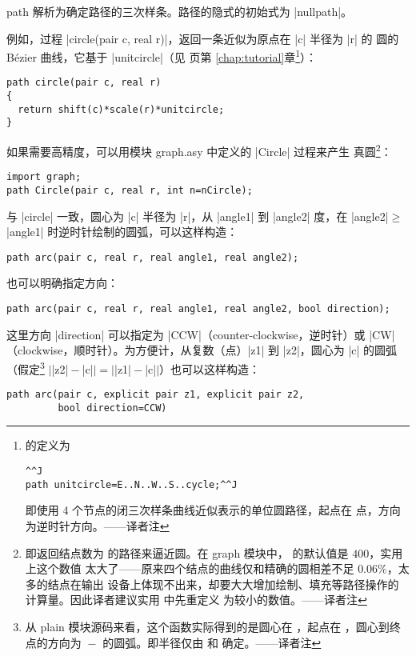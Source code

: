 \documentclass{ctexbook}
\makeatletter
\let\geq\geqslant
\newenvironment{typelist}{\itemize
  \let\old@item\@item
  \def\@item[##1]{\expandafter\old@item[\ttfamily\color{type!50!black}##1]}}
{\enditemize}
\newcommand*\prgname[1]{\textsf{#1}}
\newcommand\transnote[1]{\footnote{#1——译者注}}
\makeatother
\begin{document}
\begin{typelist}
\item[path] 解析为确定路径的三次样条。路径的隐式的初始式为 |nullpath|。

例如，过程 |circle(pair c, real r)|，返回一条近似为原点在 |c| 半径为 |r| 的
圆的 Bézier 曲线，它基于 |unitcircle|（见 \pageref{chap:tutorial} 页第%
\ref{chap:tutorial}章\transnote{ 的定义为
\begin{lstlisting}^^J
path unitcircle=E..N..W..S..cycle;^^J
\end{lstlisting}
即使用 4 个节点的闭三次样条曲线近似表示的单位圆路径，起点在
\inlinecode{(1,0)} 点，方向为逆时针方向。}）：
\begin{lstlisting}
path circle(pair c, real r)
{
  return shift(c)*scale(r)*unitcircle;
}
\end{lstlisting}
如果需要高精度，可以用模块 \prgname{graph.asy} 中定义的 |Circle| 过程来产生
真圆\transnote{即返回结点数为  的路径来逼近圆。在
\prgname{graph} 模块中，\inlinecode{nCircle} 的默认值是 $400$，实用上这个数值
太大了——原来四个结点的曲线仅和精确的圆相差不足 $0.06\%$，太多的结点在输出
设备上体现不出来，却要大大增加绘制、填充等路径操作的计算量。因此译者建议实用
中先重定义 \inlinecode{nCircle} 为较小的数值。}：
\begin{lstlisting}
import graph;
path Circle(pair c, real r, int n=nCircle);
\end{lstlisting}

与 |circle| 一致，圆心为 |c| 半径为 |r|，从 |angle1| 到 |angle2| 度，在
|angle2|${}\geq{}$|angle1| 时逆时针绘制的圆弧，可以这样构造：
\begin{lstlisting}
path arc(pair c, real r, real angle1, real angle2);
\end{lstlisting}

也可以明确指定方向：
\begin{lstlisting}
path arc(pair c, real r, real angle1, real angle2, bool direction);
\end{lstlisting}
这里方向 |direction| 可以指定为 |CCW|（counter-clockwise，逆时针）或 |CW|%
（clockwise，顺时针）。为方便计，从复数（点）|z1| 到 |z2|，圆心为 |c| 的圆弧
（假定\transnote{从 \prgname{plain} 模块源码来看，这个函数实际得到的是圆心在
，起点在 \inlinecode{z1}，圆心到终点的方向为
\inlinecode{z2}${}-{}$\inlinecode{c} 的圆弧。即半径仅由 \inlinecode{c} 和
\inlinecode{z1} 确定。}
$\vert$|z2|${}-{}$|c|$\vert=\vert$|z1|${}-{}$|c|$\vert$）也可以这样构造：
\begin{lstlisting}
path arc(pair c, explicit pair z1, explicit pair z2,
         bool direction=CCW)
\end{lstlisting}


\end{typelist}
\end{document}

